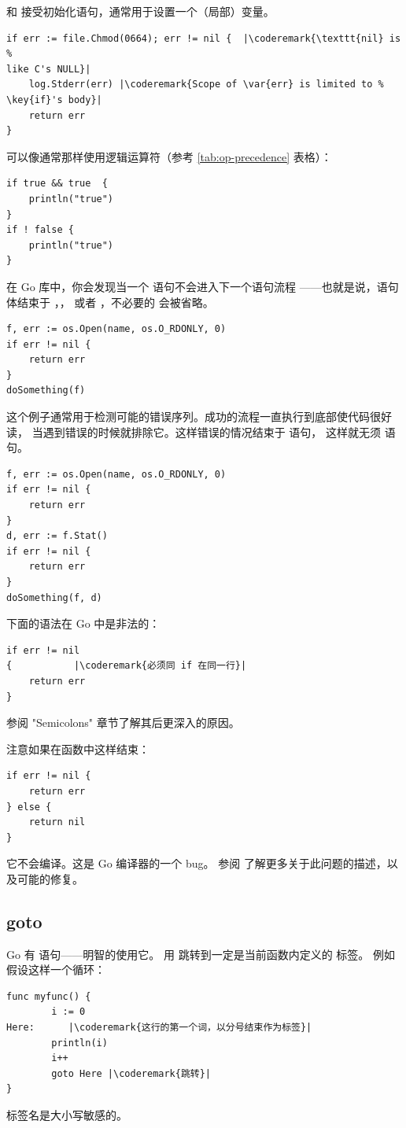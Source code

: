  和  接受初始化语句，通常用于设置一个（局部）变量。
\begin{lstlisting}
if err := file.Chmod(0664); err != nil {  |\coderemark{\texttt{nil} is %
like C's NULL}|
    log.Stderr(err) |\coderemark{Scope of \var{err} is limited to %
\key{if}'s body}|
    return err
}
\end{lstlisting}
可以像通常那样使用逻辑运算符（参考 \ref{tab:op-precedence} 表格）：
\begin{lstlisting}
if true && true  {
    println("true")
}
if ! false {
    println("true")
}
\end{lstlisting}

在 Go 库中，你会发现当一个  语句不会进入下一个语句流程
——也就是说，语句体结束于 ，，
或者 ，不必要的  会被省略。

\begin{lstlisting}
f, err := os.Open(name, os.O_RDONLY, 0)
if err != nil {
    return err
}
doSomething(f)
\end{lstlisting}
这个例子通常用于检测可能的错误序列。成功的流程一直执行到底部使代码很好读，
当遇到错误的时候就排除它。这样错误的情况结束于  语句，
这样就无须  语句。
\begin{lstlisting}
f, err := os.Open(name, os.O_RDONLY, 0)
if err != nil {
    return err
}
d, err := f.Stat()
if err != nil {
    return err
}
doSomething(f, d)
\end{lstlisting}
下面的语法在 Go 中是非法的：
\begin{lstlisting}
if err != nil
{		    |\coderemark{必须同 if 在同一行}|
    return err
}
\end{lstlisting}
参阅 \cite{effective_go} "Semicolons" 章节了解其后更深入的原因。

\begin{lbar}
注意如果在函数中这样结束：
\begin{lstlisting}
if err != nil {
    return err
} else {
    return nil
}
\end{lstlisting}
它不会编译。这是 Go 编译器的一个 bug。
参阅 \cite{go_issue_65} 了解更多关于此问题的描述，以及可能的修复。
\end{lbar}

\subsection{goto}
Go 有  语句——明智的使用它。
用  跳转到一定是当前函数内定义的  标签。
例如假设这样一个循环：
\begin{lstlisting}
func myfunc() {
        i := 0                                                                                      
Here:	   |\coderemark{这行的第一个词，以分号结束作为标签}|
        println(i)
        i++ 
        goto Here |\coderemark{跳转}|
}
\end{lstlisting}
标签名是大小写敏感的。

